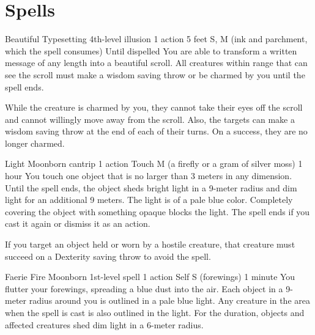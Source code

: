 \chapter{Spells}
\DndSpellHeader%
    {Beautiful Typesetting}
    {4th-level illusion}
    {1 action}
    {5 feet}
    {S, M (ink and parchment, which the spell consumes)}
    {Until dispelled}
You are able to transform a written message of any length into a beautiful scroll. All creatures within range that can see the scroll must make a wisdom saving throw or be charmed by you until the spell ends.

While the creature is charmed by you, they cannot take their eyes off the scroll and cannot willingly move away from the scroll. Also, the targets can make a wisdom saving throw at the end of each of their turns. On a success, they are no longer charmed.

\DndSpellHeader %
    {Light \label{spell::light}}
    {Moonborn cantrip}
    {1 action}
    {Touch}
    {M (a firefly or a gram of silver moss)}
    {1 hour}
You touch one object that is no larger than 3 meters in any dimension.
Until the spell ends, the object sheds bright light in a 9-meter radius and dim light for an additional 9 meters.
The light is of a pale blue color.
Completely covering the object with something opaque blocks the light.
The spell ends if you cast it again or dismiss it as an action.

If you target an object held or worn by a hostile creature, that creature must succeed on a Dexterity saving throw to avoid the spell.

\DndSpellHeader %
    {Faerie Fire \label{spell::faeriefire}}
    {Moonborn 1st-level spell}
    {1 action}
    {Self}
    {S (forewings)}
    {1 minute}
You flutter your forewings, spreading a blue dust into the air.
Each object in a 9-meter radius around you is outlined in a pale blue light.
Any creature in the area when the spell is cast is also outlined in the light.
For the duration, objects and affected creatures shed dim light in a 6-meter radius.

